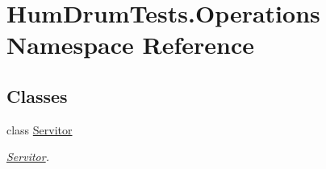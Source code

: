 \hypertarget{namespaceHumDrumTests_1_1Operations}{}\section{Hum\+Drum\+Tests.\+Operations Namespace Reference}
\label{namespaceHumDrumTests_1_1Operations}
\subsection*{Classes}
\begin{DoxyCompactItemize}
\item 
class \hyperlink{classHumDrumTests_1_1Operations_1_1Servitor}{Servitor}
\begin{DoxyCompactList}\small\item\em \hyperlink{classHumDrumTests_1_1Operations_1_1Servitor}{Servitor}. \end{DoxyCompactList}\end{DoxyCompactItemize}
